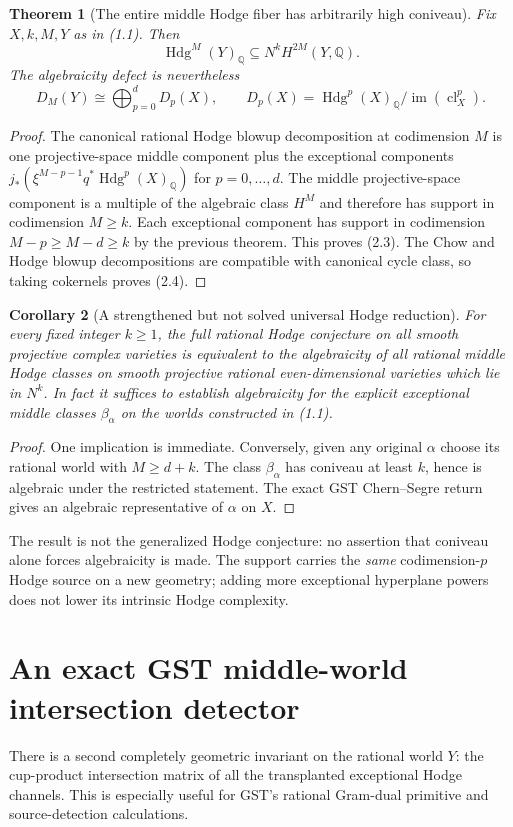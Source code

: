 \documentclass[11pt]{article}
\newcommand{\Q}{\mathbb Q}
\newcommand{\Hdg}{\operatorname{Hdg}}
\newcommand{\cl}{\operatorname{cl}}
\newcommand{\im}{\operatorname{im}}
\newtheorem{theorem}{Theorem}[section]
\newtheorem{corollary}[theorem]{Corollary}
\begin{document}
\begin{theorem}[The entire middle Hodge fiber has arbitrarily high coniveau]
Fix \(X,k,M,Y\) as in (1.1). Then
\[
 \boxed{\Hdg^M(Y)_{\Q}\subseteq
        N^kH^{2M}(Y,\Q).} \tag{2.3}
\]
The algebraicity defect is nevertheless
\[
 \boxed{
  D_M(Y)\cong\bigoplus_{p=0}^{d}D_p(X),\qquad
  D_p(X)=\Hdg^p(X)_{\Q}/\im(\cl_X^p).}
 \tag{2.4}
\]
\end{theorem}
\begin{proof}
The canonical rational Hodge blowup decomposition
at codimension \(M\) is one projective-space middle
component plus the exceptional components
\(j_*(\xi^{M-p-1}q^*\Hdg^p(X)_{\Q})\) for
\(p=0,\dots,d\). The middle projective-space
component is a multiple of the algebraic class
\(H^M\) and therefore has support in codimension
\(M\ge k\). Each exceptional component has
support in codimension \(M-p\ge M-d\ge k\)
by the previous theorem. This proves (2.3).
The Chow and Hodge blowup decompositions are
compatible with canonical cycle class, so taking
cokernels proves (2.4).
\end{proof}

\begin{corollary}[A strengthened but not solved universal Hodge reduction]
For \emph{every fixed} integer \(k\ge1\),
the full rational Hodge conjecture on all smooth
projective complex varieties is equivalent to
the algebraicity of all rational middle Hodge
classes on smooth projective rational even-dimensional
varieties \emph{which lie in} \(N^k\).
In fact it suffices to establish algebraicity for
the explicit exceptional middle classes \(\beta_\alpha\)
on the worlds constructed in (1.1).
\end{corollary}
\begin{proof}
One implication is immediate. Conversely, given
any original \(\alpha\) choose its rational world
with \(M\ge d+k\). The class \(\beta_\alpha\)
has coniveau at least \(k\), hence is algebraic
under the restricted statement. The exact GST
Chern--Segre return gives an algebraic
representative of \(\alpha\) on \(X\).
\end{proof}
The result is not the generalized Hodge conjecture:
no assertion that coniveau alone forces algebraicity
is made. The support carries the \emph{same}
codimension-\(p\) Hodge source on a new geometry;
adding more exceptional hyperplane powers does
not lower its intrinsic Hodge complexity.

\section{An exact GST middle-world intersection detector}
There is a second completely geometric invariant on the
rational world \(Y\): the cup-product intersection matrix
of all the transplanted exceptional Hodge channels.
This is especially useful for GST's rational Gram-dual
primitive and source-detection calculations.
\end{document}
